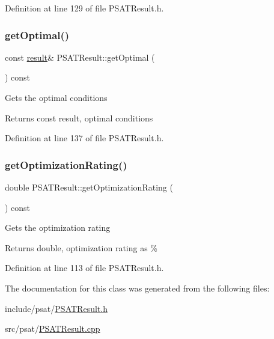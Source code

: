 Definition at line 129 of file P\+S\+A\+T\+Result.\+h.

\mbox{\label{class_p_s_a_t_result_a755c1b708e4f684ee0cc5d6ca9292286}} 
\subsubsection{\texorpdfstring{get\+Optimal()}{getOptimal()}}
{\footnotesize\ttfamily const \hyperlink{struct_p_s_a_t_result_1_1result}{result}\& P\+S\+A\+T\+Result\+::get\+Optimal (\begin{DoxyParamCaption}{ }\end{DoxyParamCaption}) const\hspace{0.3cm}{\ttfamily [inline]}}

Gets the optimal conditions \begin{DoxyReturn}{Returns}
const result, optimal conditions 
\end{DoxyReturn}


Definition at line 137 of file P\+S\+A\+T\+Result.\+h.

\mbox{\label{class_p_s_a_t_result_aa0a7001461408fcb06a6c22ce2d064db}} 
\subsubsection{\texorpdfstring{get\+Optimization\+Rating()}{getOptimizationRating()}}
{\footnotesize\ttfamily double P\+S\+A\+T\+Result\+::get\+Optimization\+Rating (\begin{DoxyParamCaption}{ }\end{DoxyParamCaption}) const\hspace{0.3cm}{\ttfamily [inline]}}

Gets the optimization rating \begin{DoxyReturn}{Returns}
double, optimization rating as \% 
\end{DoxyReturn}


Definition at line 113 of file P\+S\+A\+T\+Result.\+h.



The documentation for this class was generated from the following files\+:\begin{DoxyCompactItemize}
\item 
include/psat/\hyperlink{_p_s_a_t_result_8h}{P\+S\+A\+T\+Result.\+h}\item 
src/psat/\hyperlink{_p_s_a_t_result_8cpp}{P\+S\+A\+T\+Result.\+cpp}\end{DoxyCompactItemize}
